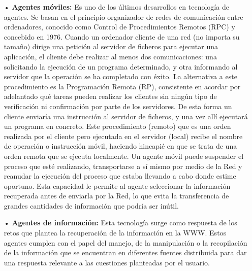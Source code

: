 \begin{itemize}
\item[•] {\bf Agentes móviles:} \vskip 0.1cm
Es uno de los últimos desarrollos en tecnología de agentes. Se basan en el principio organizador de redes de comunicación entre ordenadores, conocido como Control de Procedimientos Remotos (RPC) y concebido en 1976. Cuando un ordenador cliente de una red (no importa su tamaño) dirige una petición al servidor de ficheros para ejecutar una aplicación, el cliente debe realizar al menos dos comunicaciones: una solicitando la ejecución de un programa determinado, y otra informando al servidor que la operación se ha completado con éxito.
\vskip 0.1cm
La alternativa a este procedimiento es la Programación Remota (RP), consistente en acordar por adelantado qué tareas pueden realizar los clientes sin ningún tipo de verificación ni confirmación por parte de los servidores. De esta forma un cliente enviaría una instrucción al servidor de ficheros, y una vez allí ejecutará un programa en concreto. Este procedimiento (remoto) que es una orden realizada por el cliente pero ejecutada en el servidor (local) recibe el nombre de operación o instrucción móvil, haciendo hincapié en que se trata de una orden remota que se ejecuta localmente.
\vskip 0.1cm
Un agente móvil puede suspender el proceso que esté realizando, transportarse a sí mismo por medio de la Red y reanudar la ejecución del proceso que estaba llevando a cabo donde estime oportuno. Esta capacidad le permite al agente seleccionar la información recuperada antes de enviarla por la Red, lo que evita la transferencia de grandes cantidades de información que podría ser inútil.

\item[•] {\bf Agentes de información:} \vskip 0.1cm
Esta tecnología surge como respuesta de los retos que plantea la recuperación de la información en la WWW. Estos agentes cumplen con el papel del manejo, de la manipulación o la recopilación de la información que se encuentran en diferentes fuentes distribuida para dar una respuesta relevante a las cuestiones planteadas por el usuario.


\end{itemize}
